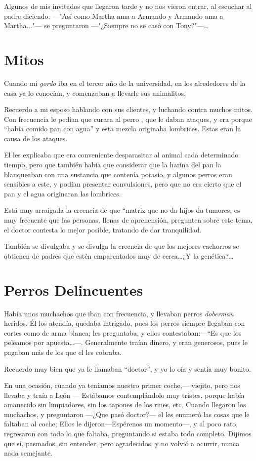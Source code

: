 \documentclass[letterpaper, 12pt]{book}
\begin{document}
Algunos de mis invitados que llegaron tarde y no nos vieron entrar, al escuchar al padre diciendo: ---"Así como Martha ama a Armando y Armando ama a Martha..."--- se preguntaron ---"¿Siempre no se casó con Tony?"---\ldots

\chapter{Mitos}
Cuando mi {\it gordo} iba en el tercer año de la universidad, en los alrededores de la casa ya lo conocían, y comenzaban a llevarle sus animalitos.

Recuerdo a mi esposo hablando con sus clientes, y luchando contra muchos mitos. Con frecuencia le pedían que curara al perro , que le daban ataques, y era porque ``había comido pan con agua'' y esta mezcla originaba lombrices. Estas eran la causa de los ataques.

El les explicaba que era conveniente desparasitar al animal cada determinado tiempo, pero que también había que considerar que la harina del pan la blanqueaban con una sustancia que contenía potasio, y algunos perros eran sensibles a este, y podían presentar convulsiones, pero que no era cierto que el pan y el agua originaran las lombrices.

Está muy arraigada la creencia de que ``matriz que no da hijos da tumores; es muy frecuente que las personas, llenas de aprehensión, pregunten sobre este tema, el doctor contesta lo mejor posible, tratando de dar tranquilidad. 

También se divulgaba y se divulga la creencia de que los mejores cachorros se obtienen de padres que estén emparentados muy de cerca\ldots¿Y la genética?\ldots

\chapter{Perros Delincuentes}
Había unos muchachos que iban con frecuencia, y llevaban perros {\it doberman} heridos. Él los atendía, quedaba intrigado, pues los perros siempre llegaban con cortes como de arma blanca; les preguntaba, y ellos contestaban:---``Es que los peleamos por apuesta\ldots---. Generalmente traían dinero, y eran generosos, pues le pagaban más de los que el les cobraba.

Recuerdo muy bien que ya le llamaban ``doctor'', y yo lo oía y sentía muy bonito.

En una ocasión, cuando ya teníamos nuestro primer coche,--- viejito, pero nos llevaba y traía a León --- Estábamos contemplándolo muy tristes, porque había amanecido sin limpiadores, sin los tapones de los rines, etc. Cuando llegaron los muchachos, y preguntaron ---¿Que pasó doctor?--- el les enumeró las cosas que le faltaban al coche; Ellos le dijeron---Espérenos un momento---, y al poco rato, regresaron con todo lo que faltaba, preguntando si estaba todo completo. Dijimos que sí, pasmados, sin entender, pero agradecidos, y no volvió a ocurrir, nunca nada semejante.
\end{document}
